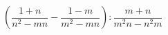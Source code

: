 \begin{ex}[type=expression]
	\begin{condition}
		\(\left( \dfrac{1+n}{n^2-mn}-\dfrac{1-m}{m^2-mn} \right):\dfrac{m+n}{m^2n-n^2m}\)
	\end{condition}
\end{ex}